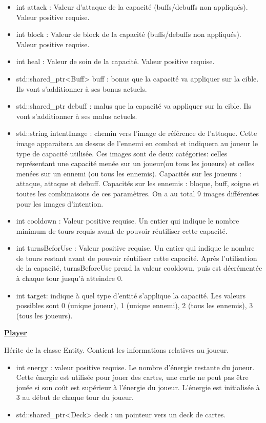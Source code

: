 \begin{itemize}
    \item int attack : Valeur d'attaque de la capacité (buffs/debuffs non appliqués). Valeur positive requise.
    \item int block : Valeur de block de la capacité (buffs/debuffs non appliqués). Valeur positive requise.
    \item int heal : Valeur de soin de la capacité. Valeur positive requise.
    \item std::shared\_ptr<Buff>  buff : bonus que la capacité va appliquer sur la cible. Ils vont s'additionner à ses bonus actuels.
    \item std::shared\_ptr debuff : malus que la capacité va appliquer sur la cible. Ils vont s'additionner à ses malus actuels.
    \item std::string intentImage : chemin vers l'image de référence de l'attaque. Cette image apparaitera au dessus de l'ennemi en combat et indiquera au joueur le type de capacité utilisée. Ces images sont de deux catégories: celles représentant une capacité menée sur un joueur(ou tous les joueurs) et celles menées sur un ennemi (ou tous les ennemis).
    Capacités sur les joueurs : attaque, attaque et debuff.
    Capacités sur les ennemis : bloque, buff, soigne et toutes les combinaisons de ces paramètres. On a au total 9 images différentes pour les images d'intention.
    \item int cooldown : Valeur positive requise. Un entier qui indique le nombre minimum de tours requis avant de pouvoir réutiliser cette capacité. 
    \item int turnsBeforUse : Valeur positive requise. Un entier qui indique le nombre de tours restant avant de pouvoir réutiliser cette capacité. Après l'utilisation de la capacité, turnsBeforeUse prend la valeur cooldown, puis est décrémentée à chaque tour jusqu'à atteindre 0.
    \item int target: indique à quel type d'entité s'applique la capacité. Les valeurs possibles sont 0 (unique joueur), 1 (unique ennemi), 2 (tous les ennemis), 3 (tous les joueurs).
\end{itemize}


\underline{\textbf{Player}}
\par Hérite de la classe Entity. Contient les informations relatives au joueur.
\begin{itemize}
    \item int energy : valeur positive requise. Le nombre d'énergie restante du joueur. Cette énergie est utilisée pour jouer des cartes, une carte ne peut pas être jouée si son coût est supérieur à l'énergie du joueur. L'énergie est initialisée à 3 au début de chaque tour du joueur.
    \item std::shared\_ptr<Deck>  deck : un pointeur vers un deck de cartes.
\end{itemize}

